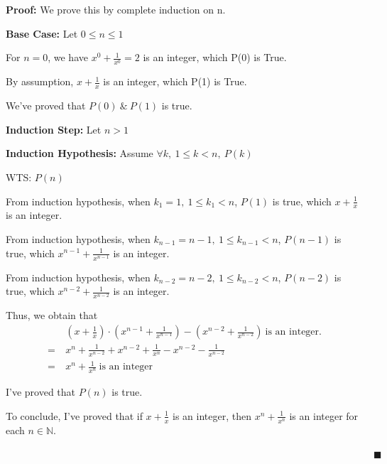 \documentclass[12pt]{article}
\begin{document}
\begin{enumerate}[label=(\alph*)]
    \textbf{Proof:} We prove this by complete induction on n.

    \textbf{Base Case:} Let $0 \leq n \leq 1$

    For $n=0$, we have $x^0 + \frac{1}{x^0} = 2$ is an integer, which P(0) is True.

    By assumption, $x + \frac{1}{x}$ is an integer, which P(1) is True.

    We've proved that $P(0)\ \&\ P(1)$ is true.

    \textbf{Induction Step:} Let $n > 1$
    
    \textbf{Induction Hypothesis:} Assume $\forall k,\ 1 \leq k < n,\ P(k)$

    WTS: $P(n)$

    From induction hypothesis, when $k_1 = 1,\ 1 \leq k_1 < n$, $P(1)$ is true, which $x + \frac{1}{x}$ is an integer.
    
    From induction hypothesis, when $k_{n-1} = n-1,\ 1 \leq k_{n-1} < n$, $P(n-1)$ is true, which $x^{n-1} + \frac{1}{x^{n-1}}$ is an integer.

    From induction hypothesis, when $k_{n-2} = n-2,\ 1 \leq k_{n-2} < n$, $P(n-2)$ is true, which $x^{n-2} + \frac{1}{x^{n-2}}$ is an integer.

    Thus, we obtain that 
    \begin{align*}
        &(x+\frac{1}{x})\cdot (x^{n-1} + \frac{1}{x^{n-1}}) - (x^{n-2} + \frac{1}{x^{n-2}})\ \text{is an integer.} \\
        =\ &x^n + \frac{1}{x^{n-2}} + x^{n-2} + \frac{1}{x^n} - x^{n-2} - \frac{1}{x^{n-2}} \\
        =\ &x^n + \frac{1}{x^n} \ \text{is an integer}
    \end{align*}

    I've proved that $P(n)$ is true.

    To conclude, I've proved that if $x+\frac{1}{x}$ is an integer, then $x^n + \frac{1}{x^n} $ is an integer for each $n \in \mathbb{N}$.

    $\quad \quad \quad \quad \quad \quad \quad \quad \quad \quad \quad \quad \quad \quad \quad \quad \quad \quad \quad \quad \quad \quad \quad \quad \quad \quad \quad \quad \quad \quad \quad \quad \quad \quad \quad \quad \quad \blacksquare $
\end{enumerate}


\end{document}
